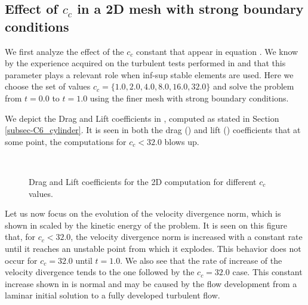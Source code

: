 \subsection{Effect of $ c_c $ in a 2D mesh with strong boundary conditions}
We first analyze the effect of the $ c_c $ constant that appear in equation . We know by the experience acquired on the turbulent tests performed in  and  that this parameter plays a relevant role when inf-sup stable elements are used. Here we choose the set of values $ c_c = \{1.0,2.0,4.0,8.0,16.0,32.0\} $ and solve the problem from $ t=0.0 $ to $ t=1.0 $ using the finer mesh with strong boundary conditions.

We depict the Drag and Lift coefficients in , computed as stated in Section \ref{subsec-C6_cylinder}. It is seen in both the drag () and lift () coefficients that at some point, the computations for $ c_c<32.0 $ blows up.
\begin{figure}[h!]
  \centering
  \\
  \caption{Drag and Lift coefficients for the 2D computation for different $ c_c $ values.}
  \label{fig-NACA_c_c_drag_lift}
\end{figure}
Let us now focus on the evolution of the velocity divergence norm, which is shown in  scaled by the kinetic energy of the problem. It is seen on this figure that, for $ c_c<32.0 $, the velocity divergence norm is increased with a constant rate until it reaches an unstable point from which it explodes. This behavior does not occur for $ c_c=32.0 $ until $ t=1.0 $. We also see that the rate of increase of the velocity divergence tends to the one followed by the $ c_c=32.0 $ case. This constant increase shown in  is normal and may be caused by the flow development from a laminar initial solution to a fully developed turbulent flow.

